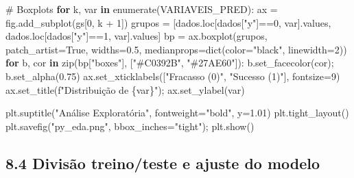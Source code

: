 \documentclass[
  letterpaper,
  DIV=11,
  numbers=noendperiod]{scrartcl}
\newenvironment{Shaded}{\begin{snugshade}}{\end{snugshade}}
\newcommand{\BuiltInTok}[1]{\textcolor[rgb]{0.00,0.23,0.31}{#1}}
\newcommand{\CommentTok}[1]{\textcolor[rgb]{0.37,0.37,0.37}{#1}}
\newcommand{\ControlFlowTok}[1]{\textcolor[rgb]{0.00,0.23,0.31}{\textbf{#1}}}
\newcommand{\DecValTok}[1]{\textcolor[rgb]{0.68,0.00,0.00}{#1}}
\newcommand{\FloatTok}[1]{\textcolor[rgb]{0.68,0.00,0.00}{#1}}
\newcommand{\KeywordTok}[1]{\textcolor[rgb]{0.00,0.23,0.31}{\textbf{#1}}}
\newcommand{\NormalTok}[1]{\textcolor[rgb]{0.00,0.23,0.31}{#1}}
\newcommand{\OperatorTok}[1]{\textcolor[rgb]{0.37,0.37,0.37}{#1}}
\newcommand{\SpecialCharTok}[1]{\textcolor[rgb]{0.37,0.37,0.37}{#1}}
\newcommand{\SpecialStringTok}[1]{\textcolor[rgb]{0.13,0.47,0.30}{#1}}
\newcommand{\StringTok}[1]{\textcolor[rgb]{0.13,0.47,0.30}{#1}}
\newcommand{\VariableTok}[1]{\textcolor[rgb]{0.07,0.07,0.07}{#1}}
\begin{document}
\begin{Shaded}
\begin{Highlighting}[]
\CommentTok{\# Boxplots}
\ControlFlowTok{for}\NormalTok{ k, var }\KeywordTok{in} \BuiltInTok{enumerate}\NormalTok{(VARIAVEIS\_PRED):}
\NormalTok{    ax }\OperatorTok{=}\NormalTok{ fig.add\_subplot(gs[}\DecValTok{0}\NormalTok{, k }\OperatorTok{+} \DecValTok{1}\NormalTok{])}
\NormalTok{    grupos }\OperatorTok{=}\NormalTok{ [dados.loc[dados[}\StringTok{"y"}\NormalTok{]}\OperatorTok{==}\DecValTok{0}\NormalTok{, var].values,}
\NormalTok{              dados.loc[dados[}\StringTok{"y"}\NormalTok{]}\OperatorTok{==}\DecValTok{1}\NormalTok{, var].values]}
\NormalTok{    bp }\OperatorTok{=}\NormalTok{ ax.boxplot(grupos, patch\_artist}\OperatorTok{=}\VariableTok{True}\NormalTok{, widths}\OperatorTok{=}\FloatTok{0.5}\NormalTok{,}
\NormalTok{                    medianprops}\OperatorTok{=}\BuiltInTok{dict}\NormalTok{(color}\OperatorTok{=}\StringTok{"black"}\NormalTok{, linewidth}\OperatorTok{=}\DecValTok{2}\NormalTok{))}
    \ControlFlowTok{for}\NormalTok{ b, cor }\KeywordTok{in} \BuiltInTok{zip}\NormalTok{(bp[}\StringTok{"boxes"}\NormalTok{], [}\StringTok{"\#C0392B"}\NormalTok{, }\StringTok{"\#27AE60"}\NormalTok{]):}
\NormalTok{        b.set\_facecolor(cor)}\OperatorTok{;}\NormalTok{ b.set\_alpha(}\FloatTok{0.75}\NormalTok{)}
\NormalTok{    ax.set\_xticklabels([}\StringTok{"Fracasso (0)"}\NormalTok{, }\StringTok{"Sucesso (1)"}\NormalTok{], fontsize}\OperatorTok{=}\DecValTok{9}\NormalTok{)}
\NormalTok{    ax.set\_title(}\SpecialStringTok{f"Distribuição de }\SpecialCharTok{\{}\NormalTok{var}\SpecialCharTok{\}}\SpecialStringTok{"}\NormalTok{)}\OperatorTok{;}\NormalTok{ ax.set\_ylabel(var)}

\NormalTok{plt.suptitle(}\StringTok{"Análise Exploratória"}\NormalTok{, fontweight}\OperatorTok{=}\StringTok{"bold"}\NormalTok{, y}\OperatorTok{=}\FloatTok{1.01}\NormalTok{)}
\NormalTok{plt.tight\_layout()}
\NormalTok{plt.savefig(}\StringTok{"py\_eda.png"}\NormalTok{, bbox\_inches}\OperatorTok{=}\StringTok{"tight"}\NormalTok{)}\OperatorTok{;}\NormalTok{ plt.show()}
\end{Highlighting}
\end{Shaded}

\subsection{8.4 Divisão treino/teste e ajuste do
modelo}\label{divisuxe3o-treinoteste-e-ajuste-do-modelo-1}
\end{document}
